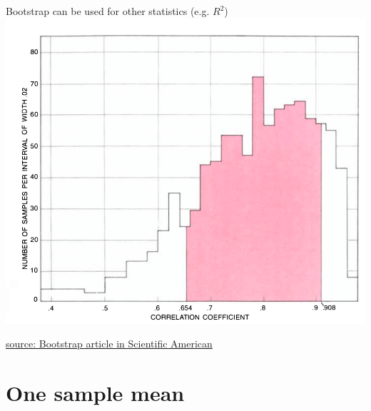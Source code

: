 \documentclass[10pt]{beamer}\usepackage[]{graphicx}\usepackage[]{color}
\begin{document}
\begin{frame}{Bootstrap can be used for other statistics (e.g. $R^2$)}
	\centering
	\includegraphics[scale=0.29]{bootcorr.png}
	
	\vspace{0.1in}
	
	\tiny \href{https://www.dropbox.com/s/cxiq70zxxtyxlb5/EfronDiaconisBootstrap.pdf?dl=0}{source: Bootstrap article in Scientific American}
\end{frame}


\section{One sample mean}
\end{document}
